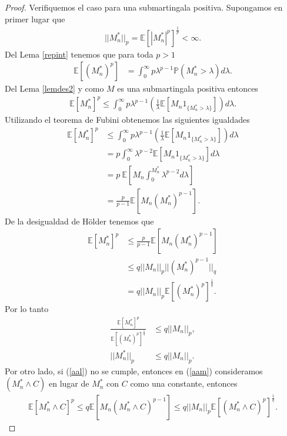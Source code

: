 \begin{proof}
Verifiquemos el caso para una submartingala positiva. Supongamos en primer lugar que
	\begin{align}
	||M_n^{*}||_p = \mathbb{E}[|M_n^{*}|^p]^{\frac{1}{p}} < \infty. \label{aal}
	\end{align}
Del Lema \ref{repint} tenemos que para toda $p > 1$
	\begin{align*}
	\mathbb{E}[(M_n^{*})^p] & = \int_0^{\infty} p \lambda^{p-1} \mathbb{P}(M_n^{*} > \lambda) d\lambda.
	\end{align*}
Del Lema \ref{lemdes2} y como $M$ es una submartingala positiva entonces
	\begin{align*}
	\mathbb{E}[M_n^{*}]^p  \leq \int_0^{\infty} p \lambda^{p-1} \left( \frac{1}{\lambda} \mathbb{E}[M_n 1_{\{M_n^{*} > \lambda\}}] \right) d\lambda.
	\end{align*}
Utilizando el teorema de Fubini obtenemos las siguientes igualdades
	\begin{align}
	\mathbb{E}[M_n^{*}]^p & \leq \int_0^{\infty} p \lambda^{p-1} \left( \frac{1}{\lambda} \mathbb{E}[M_n 1_{\{M_n^{*} > \lambda\}} ] \right) d\lambda \nonumber \\
	& = p  \int_0^{\infty} \lambda^{p-2} \mathbb{E}[M_n 1_{\{M_n^{*} > \lambda\}}] d\lambda \nonumber \\
	& = p \ \mathbb{E} \left[ M_n \int_0^{M_n^{*}} \lambda^{p-2} d\lambda \right] \nonumber \\
	& = \frac{p}{p-1} \mathbb{E}[M_n (M_n^{*})^{p-1}]. \label{aam}
	\end{align}
De la desigualdad de Hölder tenemos que
	\begin{align*}
	\mathbb{E}[M_n^{*}]^p & \leq \frac{p}{p-1} \mathbb{E}[M_n (M_n^{*})^{p-1}] \\
	& \leq q ||M_n||_p ||(M_n^{*})^{p-1}||_q \\
	& = q ||M_n||_p \mathbb{E}[(M_n^{*})^p]^{\frac{1}{q}}.
	\end{align*}
Por lo tanto
	\begin{align*}
	\frac{\mathbb{E}[M_n^{*}]^p}{\mathbb{E}[(M_n^{*})^p]^{\frac{1}{q}}} & \leq q ||M_n||_p, \\
	||M_n^{*}||_p & \leq q ||M_n||_p.
	\end{align*}
Por otro lado, si (\ref{aal}) no se cumple, entonces en (\ref{aam}) consideramos $(M_n^{*} \wedge C)$ en lugar de $M_n^{*}$ con $C$ como una constante, entonces
	\begin{align*}
		\mathbb{E}[M_n^{*} \wedge C]^p \leq q\mathbb{E}[M_n (M_n^{*} \wedge C)^{p-1}] \leq q ||M_n||_p \mathbb{E}[(M_n^{*} \wedge C)^p]^{\frac{1}{q}}.

\end{align*}
\end{proof}
